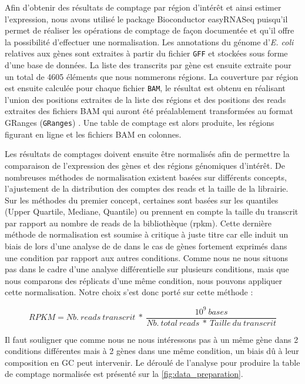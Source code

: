 \documentclass[12pt,a4paper]{report}
\begin{document}
\begin{onehalfspace}
Afin d'obtenir des résultats de comptage par région d'intérêt et ainsi estimer l'expression, nous avons utilisé le package Bioconductor easyRNASeq \citep{Delhomme2012} puisqu'il permet de réaliser les opérations de comptage de façon documentée et qu'il offre la possibilité d'effectuer une normalisation. Les annotations du génome d'\textit{E. coli} relatives aux gènes sont extraites à partir du fichier \texttt{GFF} et stockées sous forme d'une base de données.
La liste des transcrits par gène est ensuite extraite pour un total de 4605 éléments que nous nommerons régions. La couverture par région est ensuite calculée pour chaque fichier \texttt{BAM}, le résultat est obtenu en réalisant l'union des positions extraites de la liste des régions et des positions des reads extraites des fichiers BAM qui auront été préalablement transformées au format \gls{GRanges} (\texttt{GRanges})  \citep{Lawrence2013}. Une table de comptage est alors produite, les régions figurant en ligne et les fichiers BAM en colonnes.

Les résultats de comptages doivent ensuite être normalisés afin de permettre la comparaison de l'expression des gènes et des régions génomiques d'intérêt. De nombreuses méthodes de normalisation existent basées sur différents concepts, l'ajustement de la distribution des comptes des reads et la taille de la librairie. Sur les méthodes du premier concept, certaines sont basées sur les quantiles (Upper Quartile, Mediane, Quantile) ou prennent en compte la taille du transcrit par rapport au nombre de reads de la bibliothèque (\gls{rpkm}). Cette dernière méthode de normalisation est soumise à critique à juste titre \citep{Dillies2013} car elle induit un biais de lors d'une analyse de \gls{de} dans le cas de gènes fortement exprimés dans une condition par rapport aux autres conditions. Comme nous ne nous situons pas dans le cadre d'une analyse différentielle sur plusieurs conditions, mais que nous comparons des réplicats d'une même condition, nous pouvons appliquer cette normalisation. Notre choix s'est donc porté sur cette méthode \citep{Mortazavi2008} :

\[RPKM = Nb.~reads~transcrit~*~\frac{10^9~bases}{Nb.~total~reads~*~Taille~du~transcrit}\]

Il faut souligner que comme nous ne nous intéressons pas à un même gène dans 2 conditions différentes mais à 2 gènes dans une même condition, un biais dû à leur composition en GC peut intervenir. Le déroulé de l'analyse pour produire la table de comptage normalisée est présenté sur la \autoref{fig:data_preparation}.


\end{onehalfspace}
\end{document}
